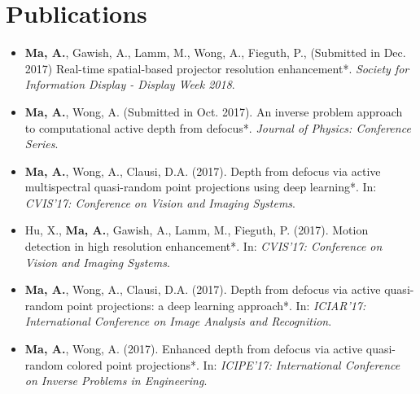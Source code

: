 \section*{Publications}
    \vspace{\postsubhead}
    \begin{adjustwidth}{\indentleft}{\indentright}
        \begin{itemize}
        
            \item \textbf{Ma, A.}, Gawish, A., Lamm, M., Wong, A., Fieguth, P., (Submitted in Dec. 2017) Real-time spatial-based projector resolution enhancement*. \emph{Society for Information Display - Display Week 2018}.
            
            \item \textbf{Ma, A.}, Wong, A. (Submitted in Oct. 2017). An inverse problem approach to computational active depth from defocus*. \emph{Journal of Physics: Conference Series}.
            
            \item \textbf{Ma, A.}, Wong, A., Clausi, D.A. (2017). Depth from defocus via active multispectral quasi-random point projections using deep learning*. In: \emph{CVIS'17: Conference on Vision and Imaging Systems}.
           
            \item Hu, X., \textbf{Ma, A.}, Gawish, A., Lamm, M., Fieguth, P. (2017). Motion detection in high resolution enhancement*. In: \emph{CVIS'17: Conference on Vision and Imaging Systems}.
            
            \item \textbf{Ma, A.}, Wong, A., Clausi, D.A. (2017). Depth from defocus via active quasi-random point projections: a deep learning approach*. In: \emph{ICIAR'17: International Conference on Image Analysis and Recognition}.
            
            \item \textbf{Ma, A.}, Wong, A. (2017). Enhanced depth from defocus via active quasi-random colored point projections*. In: \emph{ICIPE'17: International Conference on Inverse Problems in Engineering}.
                   

\end{itemize}
\end{adjustwidth}

